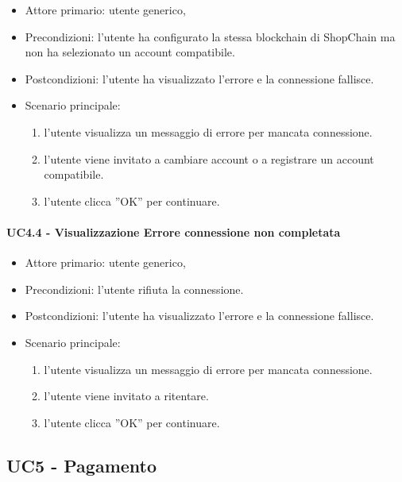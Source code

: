 \begin{itemize}
    \item Attore primario: utente generico,
    \item Precondizioni: l'utente ha configurato la stessa blockchain di ShopChain ma non ha selezionato un account compatibile.
    \item Postcondizioni: l'utente ha visualizzato l'errore e la connessione fallisce.
    \item Scenario principale: \begin{enumerate}
        \item l'utente visualizza un messaggio di errore per mancata connessione.
        \item l'utente viene invitato a cambiare account o a registrare un account compatibile.
        \item l’utente clicca ”OK” per continuare.
    \end{enumerate}
\end{itemize}

\paragraph{UC4.4 - Visualizzazione Errore connessione non completata}

\begin{itemize}
    \item Attore primario: utente generico,
    \item Precondizioni: l'utente rifiuta la connessione.
    \item Postcondizioni: l'utente ha visualizzato l'errore e la connessione fallisce.
    \item Scenario principale: \begin{enumerate}
        \item l'utente visualizza un messaggio di errore per mancata connessione.
        \item l'utente viene invitato a ritentare.
        \item l’utente clicca ”OK” per continuare.
    \end{enumerate}
\end{itemize}

\subsection{UC5 - Pagamento}

